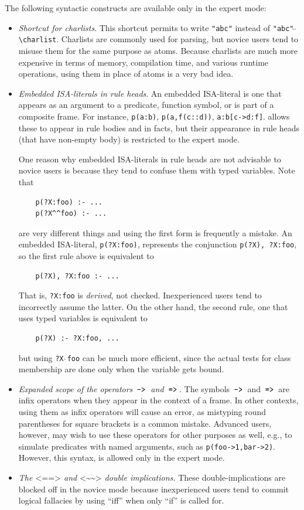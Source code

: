 \documentclass[11pt]{article}
\newcommand{\ERGO}{\mbox{\smaller{\ensuremath{\cal{E}}\smaller{{\sc{RGO}}}}}\xspace}
\newcommand{\FLSYSTEM}{\ERGO}
\newcommand{\mvd}{{\mbox{\tt \,->\,}}}  %
\newcommand{\Mvd}{{\mbox{\tt \,=>\,}}}  %
\newcommand{\rlnafarr}{\texttt{<\textasciitilde\textasciitilde>}}
\newcommand{\rlnegarr}{\texttt{<==>}}
\newcommand{\bs}{\textbackslash}
\begin{document}
\noindent
The following syntactic constructs are available only in the expert mode:
\begin{itemize}
\item  \emph{Shortcut for charlists}.
  This shortcut permits to write \texttt{"abc"} instead of
  \texttt{"abc"$\hat{~}\hat{~}$\bs{}charlist}. Charlists are commonly used
  for parsing, but novice users tend to misuse them for the same purpose as
  atoms.  Because charlists are much more expensive in terms of memory,
  compilation time, and various runtime operations, using them in place of
  atoms is a very bad idea.
\item  \emph{Embedded ISA-literals in rule heads}.
   An embedded ISA-literal is one that appears as an argument to a
   predicate, function symbol, or is part of a composite frame. For instance,
   \texttt{p(a:b)}, \texttt{p(a,f(c::d))}, \texttt{a:b[c->d:f]}.
   \FLSYSTEM allows these to appear in rule bodies and in facts, but their
   appearance in rule heads (that have non-empty body) is restricted to the
   expert mode.

   One reason why embedded ISA-literals in rule heads
   are not advisable to novice users is because they tend to confuse them
   with typed variables. Note that
\begin{verbatim}
    p(?X:foo) :- ...
    p(?X^^foo) :- ...
\end{verbatim}
   are very different things and using the first form is frequently a mistake.
   An embedded ISA-literal, \texttt{p(?X:foo)},
   represents the conjunction \texttt{p(?X), ?X:foo}, so
   the first rule above is equivalent to
\begin{verbatim}
    p(?X), ?X:foo :- ...
\end{verbatim}
   That is, \texttt{?X:foo} is \emph{derived}, not checked.
   Inexperienced users tend to incorrectly assume the latter.
   On the other hand, the second rule, one
   that uses typed variables is equivalent to
\begin{verbatim}
    p(?X) :- ?X:foo, ...
\end{verbatim}
   but using \texttt{?X$\hat{~}\hat{~}$foo} can be much
   more efficient, since the actual tests for class membership are done only
   when the variable gets bound. 
\item  \emph{Expanded scope of the operators $\mvd$ and $\Mvd$.}
  The symbols $\mvd$ and $\Mvd$ are infix operators when they appear in the
  context of a frame.  In other contexts, using them as infix operators
  will cause an error, as mistyping round parentheses for square brackets
  is a common mistake. Advanced users, however, may wish to use these
  operators for other purposes as well, e.g., to simulate predicates with
  named arguments, such as \texttt{p(foo->1,bar->2)}. 
  However, this syntax, is allowed only in the expert mode.
  \index{$\rlnegarr$}
  \index{$\rlnafarr$}
\item \emph{The $\rlnegarr$ and $\rlnafarr$ double implications.}  
  These double-implications are blocked off in the novice mode because
  inexperienced users tend to commit logical fallacies by using ``iff'' when only
  ``if'' is called for.
\end{itemize}
\end{document}
